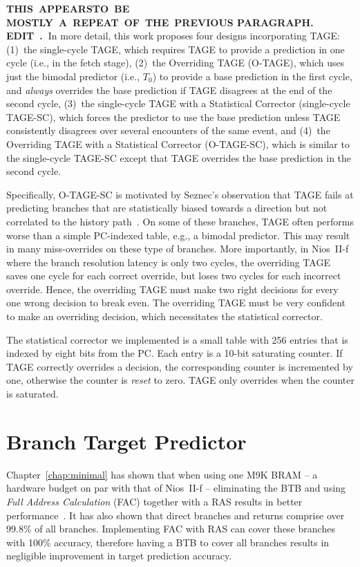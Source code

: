 \textbf{THIS\ APPEARSTO\  BE MOSTLY\ A\ REPEAT\ OF\ THE\ PREVIOUS PARAGRAPH. EDIT\ .\ }In more detail, this work proposes four designs incorporating TAGE:  (1)~the single-cycle TAGE, which requires TAGE to provide a prediction in one cycle (i.e., in the fetch stage), (2)~the Overriding TAGE (\mbox{O-TAGE}), which uses just the bimodal predictor (i.e., $T_0$) to provide a base prediction in the first cycle, and \textit{always} overrides the base prediction if TAGE disagrees at the end of the second cycle, (3)~the single-cycle TAGE with a Statistical Corrector (single-cycle \mbox{TAGE-SC}), which forces the predictor to use the base prediction unless TAGE consistently disagrees over several encounters of the same event, and (4)~the Overriding TAGE with a Statistical Corrector (\mbox{O-TAGE-SC}), which is similar to the single-cycle \mbox{TAGE-SC} except that TAGE overrides the base prediction in the second cycle.

Specifically, \mbox{O-TAGE-SC} is motivated by Seznec's observation that TAGE fails at predicting branches that are statistically biased towards a direction but not correlated to the history path~\cite{isltage}. On some of these branches, TAGE often performs worse than a simple PC-indexed table, e.g., a bimodal predictor. This may result in many miss-overrides on these type of branches. More importantly, in Nios~II-f where the branch resolution latency is only two cycles, the overriding TAGE saves one cycle for each correct override, but loses two cycles for each incorrect override. Hence, the overriding TAGE must make two right decisions for every one wrong decision to break even. The overriding TAGE must be very confident to make an overriding decision, which necessitates the statistical corrector.

The statistical corrector we implemented is a small table with 256 entries that is indexed by eight bits from the PC. Each entry is a 10-bit saturating counter. If TAGE correctly overrides a decision, the corresponding counter is incremented by one, otherwise the counter is \textit{reset} to zero. TAGE only overrides when the counter is saturated.


\section{Branch Target Predictor}
\label{sec:advanced:target}
Chapter~\ref{chap:minimal} has shown that when using one M9K BRAM -- a hardware budget on par with that of Nios~II-f -- eliminating the BTB and using \textit{Full Address Calculation} (FAC) together with a RAS results in better performance~\cite{grselect}. It has also shown that direct branches and returns comprise over 99.8\% of all branches. Implementing FAC with RAS can cover these branches with 100\% accuracy, therefore having a BTB to cover all branches results in negligible improvement in target prediction accuracy.

